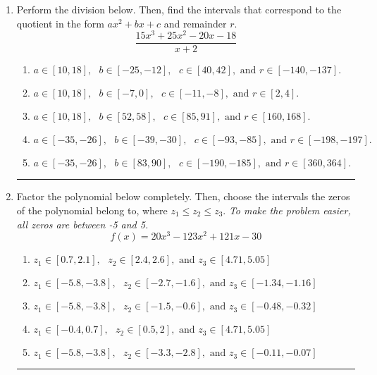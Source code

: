 \documentclass[14pt]{extbook}
\newcommand{\litem}[1]{\item#1\hspace*{-1cm}\rule{\textwidth}{0.4pt}}
\begin{document}
\begin{enumerate}
{\begin{enumerate}[label=\Alph*.]
\end{enumerate} }
\litem{
Perform the division below. Then, find the intervals that correspond to the quotient in the form $ax^2+bx+c$ and remainder $r$.\[ \frac{15x^{3} +25 x^{2} -20 x -18}{x + 2} \]\begin{enumerate}[label=\Alph*.]
\item \( a \in [10, 18], \text{   } b \in [-25, -12], \text{   } c \in [40, 42], \text{   and   } r \in [-140, -137]. \)
\item \( a \in [10, 18], \text{   } b \in [-7, 0], \text{   } c \in [-11, -8], \text{   and   } r \in [2, 4]. \)
\item \( a \in [10, 18], \text{   } b \in [52, 58], \text{   } c \in [85, 91], \text{   and   } r \in [160, 168]. \)
\item \( a \in [-35, -26], \text{   } b \in [-39, -30], \text{   } c \in [-93, -85], \text{   and   } r \in [-198, -197]. \)
\item \( a \in [-35, -26], \text{   } b \in [83, 90], \text{   } c \in [-190, -185], \text{   and   } r \in [360, 364]. \)

\end{enumerate} }
\litem{
Factor the polynomial below completely. Then, choose the intervals the zeros of the polynomial belong to, where $z_1 \leq z_2 \leq z_3$. \textit{To make the problem easier, all zeros are between -5 and 5.}\[ f(x) = 20x^{3} -123 x^{2} +121 x -30 \]\begin{enumerate}[label=\Alph*.]
\item \( z_1 \in [0.7, 2.1], \text{   }  z_2 \in [2.4, 2.6], \text{   and   } z_3 \in [4.71, 5.05] \)
\item \( z_1 \in [-5.8, -3.8], \text{   }  z_2 \in [-2.7, -1.6], \text{   and   } z_3 \in [-1.34, -1.16] \)
\item \( z_1 \in [-5.8, -3.8], \text{   }  z_2 \in [-1.5, -0.6], \text{   and   } z_3 \in [-0.48, -0.32] \)
\item \( z_1 \in [-0.4, 0.7], \text{   }  z_2 \in [0.5, 2], \text{   and   } z_3 \in [4.71, 5.05] \)
\item \( z_1 \in [-5.8, -3.8], \text{   }  z_2 \in [-3.3, -2.8], \text{   and   } z_3 \in [-0.11, -0.07] \)

\end{enumerate} }
\end{enumerate}
\end{document}
